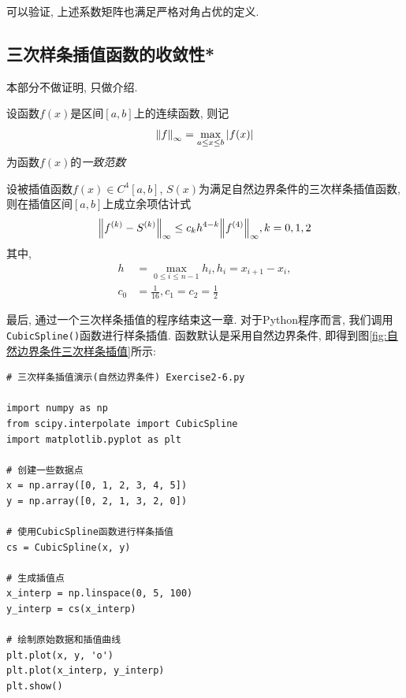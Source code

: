 可以验证, 上述系数矩阵也满足严格对角占优的定义.

\subsection{三次样条插值函数的收敛性*}

本部分不做证明, 只做介绍.

\begin{definition}[一致范数]
    设函数$f(x)$是区间$[a,b]$上的连续函数, 则记
    \begin{equation*}
        \norm{f}_{\infty}=\max_{a\le x\le b}\abs{f(x)}
    \end{equation*}
    为函数$f(x)$的\emph{一致范数}
\end{definition}

\begin{theorem}
    设被插值函数$f(x)\in C^4[a,b]$, $S(x)$为满足自然边界条件的三次样条插值函数, 则在插值区间$[a,b]$上成立余项估计式
    \begin{equation*}
        \norm{f^{(k)}-S^{(k)}}_\infty\le c_kh^{4-k}\norm{f^{(4)}}_\infty, k=0,1,2
    \end{equation*}
    其中,
    \begin{align*}
        h&=\max_{0\le i\le n-1}h_i, h_i=x_{i+1}-x_i,\\
        c_0&=\frac{1}{16}, c_1=c_2=\frac{1}{2}
    \end{align*}
\end{theorem}

最后, 通过一个三次样条插值的程序结束这一章. 对于Python程序而言, 我们调用\texttt{CubicSpline()}函数进行样条插值. 函数默认是采用自然边界条件, 即得到图\ref{fig:自然边界条件三次样条插值}所示:

\begin{lstlisting}
# 三次样条插值演示(自然边界条件) Exercise2-6.py

import numpy as np
from scipy.interpolate import CubicSpline
import matplotlib.pyplot as plt

# 创建一些数据点
x = np.array([0, 1, 2, 3, 4, 5])
y = np.array([0, 2, 1, 3, 2, 0])

# 使用CubicSpline函数进行样条插值
cs = CubicSpline(x, y)

# 生成插值点
x_interp = np.linspace(0, 5, 100)
y_interp = cs(x_interp)

# 绘制原始数据和插值曲线
plt.plot(x, y, 'o')
plt.plot(x_interp, y_interp)
plt.show()
\end{lstlisting}

